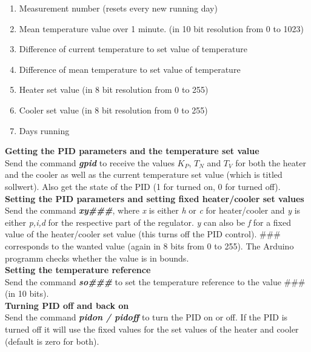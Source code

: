 \documentclass[12pt]{scrartcl}
\begin{document}
      \begin{enumerate}
        \item Measurement number (resets every new running day)
        \item Mean temperature value over 1 minute. (in 10 bit resolution from
          0 to 1023)
        \item Difference of current temperature to set value of temperature
        \item Difference of mean temperature to set value of temperature
        \item Heater set value (in 8 bit resolution from 0 to 255)
        \item Cooler set value (in 8 bit resolution from 0 to 255)
        \item Days running
      \end{enumerate}\hspace{10pt}

      \noindent\textbf{Getting the PID parameters and the temperature set value} \\
      Send the command \textbf{\textit{gpid}} to receive the values $K_P$, $T_N$
      and $T_V$ for both the heater and the cooler as well as the current
      temperature set value (which is titled sollwert). Also get the state of
      the PID (1 for turned on, 0 for turned off).\\

      \noindent\textbf{Setting the PID parameters and setting fixed heater/cooler
      set values} \\
      Send the command \textbf{\textit{xy\#\#\#}}, where \textit{x} is either
      \textit{h} or \textit{c} for heater/cooler and \textit{y} is either
      \textit{p,i,d} for the respective part of the regulator. \textit{y} can
      also be \textit{f} for a fixed value of the heater/cooler set value (this
      turns off the PID control). \#\#\# corresponds to the wanted value (again in
      8 bits from 0 to 255). The Arduino programm checks whether the value is
      in bounds.\\

      \noindent\textbf{Setting the temperature reference}\\
      Send the command \textbf{\textit{so\#\#\#}} to set the temperature
      reference to the value \#\#\# (in 10 bits).\\

      \noindent\textbf{Turning PID off and back on}\\
      Send the command \textbf{\textit{pidon / pidoff}} to turn the PID on or off.
      If the PID is turned off it will use the fixed values for the set values of
      the heater and cooler (default is zero for both).\\
\end{document}
